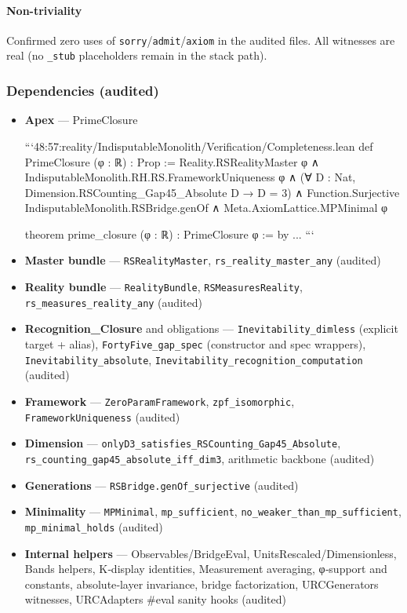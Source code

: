 \documentclass{article}
\begin{document}
\paragraph{Non-triviality}
Confirmed zero uses of \texttt{sorry}/\texttt{admit}/\texttt{axiom} in the audited files. All witnesses are real (no \texttt{\_stub} placeholders remain in the stack path).

\subsubsection{Dependencies (audited)}
\begin{itemize}[leftmargin=*]
  \item \textbf{Apex} — PrimeClosure

```48:57:reality/IndisputableMonolith/Verification/Completeness.lean
def PrimeClosure (φ : ℝ) : Prop :=
  Reality.RSRealityMaster φ ∧
  IndisputableMonolith.RH.RS.FrameworkUniqueness φ ∧
  (∀ D : Nat, Dimension.RSCounting_Gap45_Absolute D → D = 3) ∧
  Function.Surjective IndisputableMonolith.RSBridge.genOf ∧
  Meta.AxiomLattice.MPMinimal φ

theorem prime_closure (φ : ℝ) : PrimeClosure φ := by ...
```

  \item \textbf{Master bundle} — \texttt{RSRealityMaster}, \texttt{rs\_reality\_master\_any} (audited)
  \item \textbf{Reality bundle} — \texttt{RealityBundle}, \texttt{RSMeasuresReality}, \texttt{rs\_measures\_reality\_any} (audited)
  \item \textbf{Recognition\_Closure} and obligations — \texttt{Inevitability\_dimless} (explicit target + alias), \texttt{FortyFive\_gap\_spec} (constructor and spec wrappers), \texttt{Inevitability\_absolute}, \texttt{Inevitability\_recognition\_computation} (audited)
  \item \textbf{Framework} — \texttt{ZeroParamFramework}, \texttt{zpf\_isomorphic}, \texttt{FrameworkUniqueness} (audited)
  \item \textbf{Dimension} — \texttt{onlyD3\_satisfies\_RSCounting\_Gap45\_Absolute}, \texttt{rs\_counting\_gap45\_absolute\_iff\_dim3}, arithmetic backbone (audited)
  \item \textbf{Generations} — \texttt{RSBridge.genOf\_surjective} (audited)
  \item \textbf{Minimality} — \texttt{MPMinimal}, \texttt{mp\_sufficient}, \texttt{no\_weaker\_than\_mp\_sufficient}, \texttt{mp\_minimal\_holds} (audited)
  \item \textbf{Internal helpers} — Observables/BridgeEval, UnitsRescaled/Dimensionless, Bands helpers, K‑display identities, Measurement averaging, φ‑support and constants, absolute‑layer invariance, bridge factorization, URCGenerators witnesses, URCAdapters #eval sanity hooks (audited)
\end{itemize}
\end{document}
